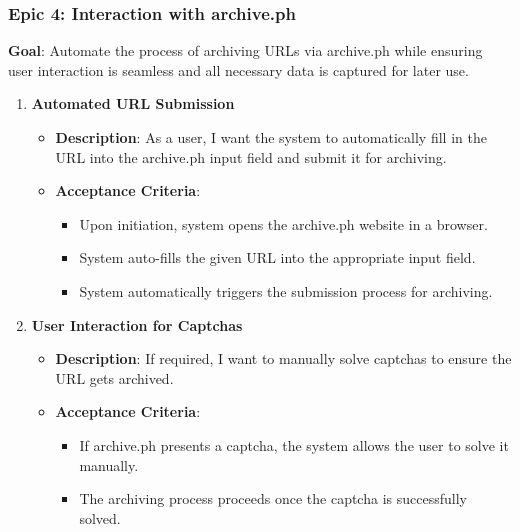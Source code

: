 \subsubsection{Epic 4: Interaction with archive.ph}
\textbf{Goal}: Automate the process of archiving URLs via archive.ph while ensuring user interaction is seamless and all necessary data is captured for later use.

\begin{enumerate}
    \item \textbf{Automated URL Submission}
    \begin{itemize}
        \item \textbf{Description}: As a user, I want the system to automatically fill in the URL into the archive.ph input field and submit it for archiving.
        \item \textbf{Acceptance Criteria}:
        \begin{itemize}
            \item Upon initiation, system opens the archive.ph website in a browser.
            \item System auto-fills the given URL into the appropriate input field.
            \item System automatically triggers the submission process for archiving.
        \end{itemize}
    \end{itemize}

    \item \textbf{User Interaction for Captchas}
    \begin{itemize}
        \item \textbf{Description}: If required, I want to manually solve captchas to ensure the URL gets archived.
        \item \textbf{Acceptance Criteria}:
        \begin{itemize}
            \item If archive.ph presents a captcha, the system allows the user to solve it manually.
            \item The archiving process proceeds once the captcha is successfully solved.
        \end{itemize}
    \end{itemize}


\end{enumerate}
